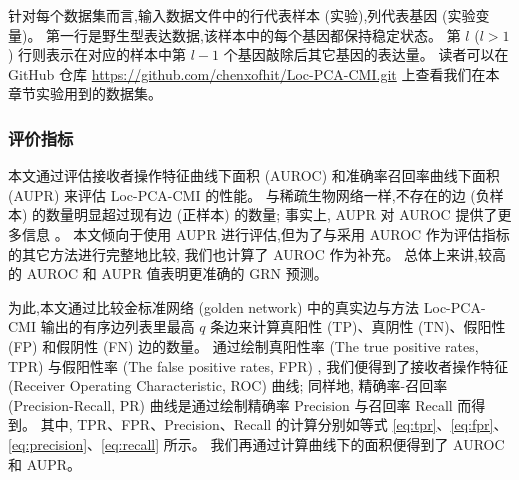 \begin{table} [!htbp]
  \caption{实验所使用的数据集描述} 
  \label{tbl} 
\end{table} 

针对每个数据集而言,输入数据文件中的行代表样本 (实验),列代表基因 (实验变量)。
第一行是野生型表达数据,该样本中的每个基因都保持稳定状态。
第 $l$ ($l>1$) 行则表示在对应的样本中第 $l-1$ 个基因敲除后其它基因的表达量。
读者可以在 GitHub 仓库 \url{https://github.com/chenxofhit/Loc-PCA-CMI.git} 上查看我们在本章节实验用到的数据集。

\subsubsection{评价指标}

本文通过评估接收者操作特征曲线下面积 (AUROC) 和准确率召回率曲线下面积 (AUPR) 来评估 Loc-PCA-CMI 的性能。
与稀疏生物网络一样,不存在的边 (负样本) 的数量明显超过现有边 (正样本) 的数量; 
事实上, AUPR 对 AUROC 提供了更多信息 \cite{saito2015precision} 。
本文倾向于使用 AUPR 进行评估,但为了与采用 AUROC 作为评估指标的其它方法进行完整地比较,
我们也计算了 AUROC 作为补充。
总体上来讲,较高的 AUROC 和 AUPR 值表明更准确的 GRN 预测。

为此,本文通过比较金标准网络 (golden network) 中的真实边与方法 Loc-PCA-CMI 输出的有序边列表里最高 $q$ 条边来计算真阳性 (TP)、真阴性 (TN)、假阳性 (FP) 和假阴性 (FN) 边的数量。
通过绘制真阳性率 (The true positive rates, TPR) 与假阳性率 (The false positive rates, FPR) ,
我们便得到了接收者操作特征 (Receiver Operating Characteristic, ROC) 曲线; 
同样地,
精确率-召回率 (Precision-Recall, PR) 曲线是通过绘制精确率 Precision 与召回率 Recall 而得到。
其中, TPR、FPR、Precision、Recall 的计算分别如等式 \ref{eq:tpr}、\ref{eq:fpr}、\ref{eq:precision}、\ref{eq:recall} 所示。
我们再通过计算曲线下的面积便得到了 AUROC 和 AUPR。

